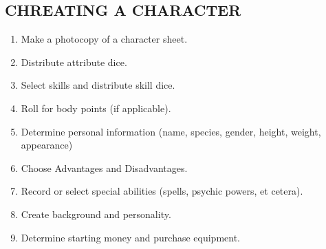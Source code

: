 \documentclass[10pt, a4paper, twoside]{book}
\begin{document}
\begin{multicols}{2}
\begin{mytextbox}
			\subsection*{CHREATING A CHARACTER}
			{\small 
				\begin{enumerate}[wide, labelwidth=!, labelindent=0pt]
					\setlength\itemsep{-0.4em}
					\item Make a photocopy of a character sheet.
					\item Distribute attribute dice.
					\item Select skills and distribute skill dice.
					\item Roll for body points (if applicable).
					\item Determine personal information (name, species, gender, height, weight, appearance)
					\item Choose Advantages and Disadvantages.
					\item Record or select special abilities (spells, psychic powers, et cetera).
					\item Create background and personality.
					\item Determine starting money and purchase equipment.
				\end{enumerate}
			}
		\end{mytextbox}

\end{multicols}
\end{document}
